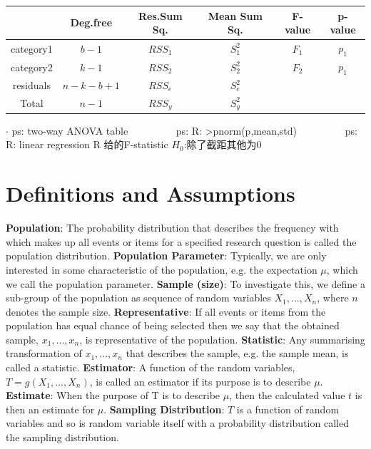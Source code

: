 \documentclass[9pt]{article}
\begin{document}
    \begin{longtable}{c|ccccc}
                  & Deg.free  & Res.Sum Sq. & Mean Sum Sq. & F-value & p-value \\
        \hline
        category1 & $b-1$     & $RSS_1$     & $S^2_1$      & $F_1$   & $p_1$   \\
        category2 & $k-1$     & $RSS_2$     & $S^2_2$      & $F_2$   & $p_1$   \\
        residuals & $n-k-b+1$ & $RSS_e$     & $S^2_e$      &         &         \\
        \hline
        Total     & $n-1$     & $RSS_y$     & $S^2_y$      &         &         \\
    \end{longtable}
    \vspace{-0.4cm}
$\cdot$ ps: two-way ANOVA table \ \ \ \ \ \ \ \ \ ps: R: >pnorm(p,mean,std)  \ \ \ \ \ \ \ \ \ ps: R: {\small linear regression R 给的F-statistic $H_0$:除了截距其他为0}

    \section{Definitions and Assumptions}

    \fontsize{7}{7}\selectfont
    \setlength{\parindent}{0pt}

    \textbf{Population}: The probability distribution that describes the frequency with which makes up all events or items for a specified research question is called the population distribution.
    \textbf{Population Parameter}: Typically, we are only interested in some characteristic of the population, e.g. the expectation $\mu$, which we call the population parameter.
    \textbf{Sample (size)}: To investigate this, we define a sub-group of the population as sequence of random variables $X_1,...,X_n$, where $n$ denotes the sample size.
    \textbf{Representative}: If all events or items from the population has equal chance of being selected then we say that the obtained sample, $x_1,...,x_n$, is representative of the population.
    \textbf{Statistic}: Any summarising transformation of $x_1,...,x_n$ that describes the sample, e.g. the sample mean, is called a statistic.
    \textbf{Estimator}: A function of the random variables, $T=g(X_1,...,X_n)$, is called an estimator if its purpose is to describe $\mu$.
    \textbf{Estimate}: When the purpose of T is to describe $\mu$, then the calculated value $t$ is then an estimate for $\mu$.
    \textbf{Sampling Distribution}: $T$ is a function of random variables and so is random variable itself with a probability distribution called the sampling distribution.
\end{document}
